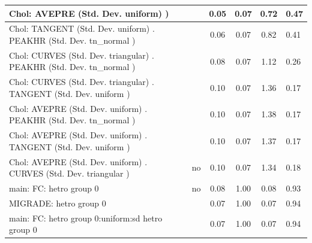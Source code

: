 \begin{table}
\begin{center}
\begin{tabular}{|l|l|c|c|c|l|}
			\hline
			 Chol: AVEPRE (Std. Dev. uniform) ) &  & 0.05 & 0.07 & 0.72 & 0.47 \\
			\hline
			 Chol: TANGENT (Std. Dev. uniform) . PEAKHR (Std. Dev.   tn_normal ) &  & 0.06 & 0.07 & 0.82 & 0.41 \\
			\hline
			 Chol: CURVES (Std. Dev. triangular) . PEAKHR (Std. Dev.   tn_normal ) &  & 0.08 & 0.07 & 1.12 & 0.26 \\
			\hline
			 Chol: CURVES (Std. Dev. triangular) . TANGENT (Std. Dev.   uniform ) &  & 0.10 & 0.07 & 1.36 & 0.17 \\
			\hline
			 Chol: AVEPRE (Std. Dev. uniform) . PEAKHR (Std. Dev.   tn_normal ) &  & 0.10 & 0.07 & 1.38 & 0.17 \\
			\hline
			 Chol: AVEPRE (Std. Dev. uniform) . TANGENT (Std. Dev.   uniform ) &  & 0.10 & 0.07 & 1.37 & 0.17 \\
			\hline
			 Chol: AVEPRE (Std. Dev. uniform) . CURVES (Std. Dev.   triangular ) & no & 0.10 & 0.07 & 1.34 & 0.18 \\
			\hline
			main: FC: hetro group 0 & no & 0.08 & 1.00 & 0.08 & 0.93 \\
			\hline
			MIGRADE: hetro group 0 &  & 0.07 & 1.00 & 0.07 & 0.94 \\
			\hline
			main: FC: hetro group 0:uniform:sd  hetro group 0 &  & 0.07 & 1.00 & 0.07 & 0.94 \\
			\hline
		\end{tabular}
	\end{center}
\end{table}